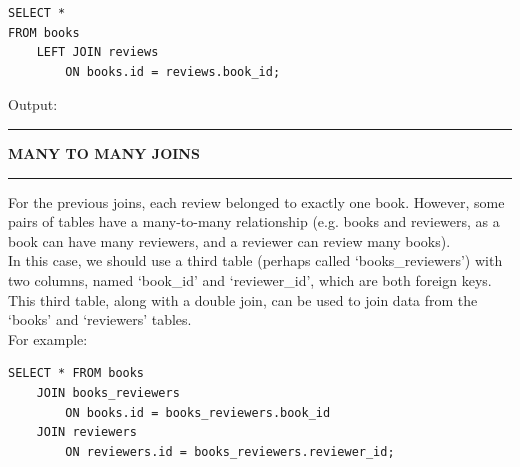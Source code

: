 \documentclass[8pt]{extarticle}
\newcommand{\heading}[1]{%
    \noindent
    \rule{\linewidth}{0.4pt}
    \begin{center}
        \vspace{-1ex}
        \textbf{#1}        
        \vspace{-2.5ex}
    \end{center}
    \rule{\linewidth}{0.4pt}
}
\begin{document}
\begin{multicols}{4}
\vspace{0.5ex}
\begin{lstlisting}[style=sql]
SELECT *
FROM books
    LEFT JOIN reviews
        ON books.id = reviews.book_id;
\end{lstlisting}
\vspace{0.5ex}

Output:

\begin{center}
\end{center}

\vspace{1ex}
\heading{MANY TO MANY JOINS}

For the previous joins, each review belonged to exactly one book. However, some pairs of tables have a many-to-many relationship (e.g. books and reviewers, as a book can have many reviewers, and a reviewer can review many books). \\

In this case, we should use a third table (perhaps called `books\_reviewers') with two columns, named `book\_id' and `reviewer\_id', which are both foreign keys. \\

This third table, along with a double join, can be used to join data from the `books' and `reviewers' tables. \\
For example:

\vspace{0.5ex}
\begin{lstlisting}[style=sql]
SELECT * FROM books
    JOIN books_reviewers
        ON books.id = books_reviewers.book_id
    JOIN reviewers
        ON reviewers.id = books_reviewers.reviewer_id;
\end{lstlisting}
\vspace{0.5ex}


\end{multicols}
\end{document}
